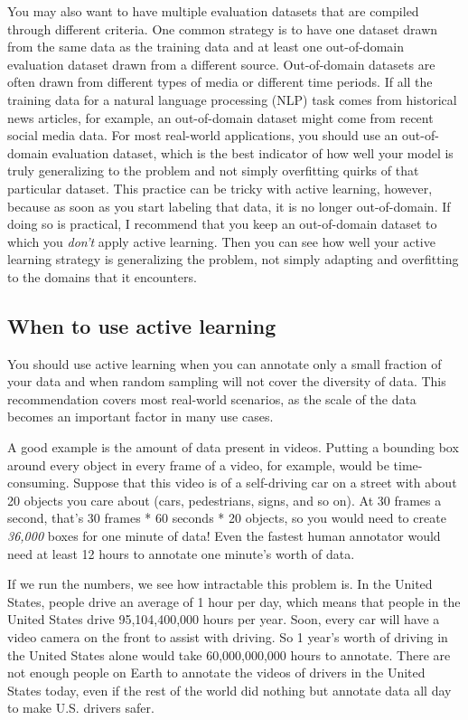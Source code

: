 \documentclass[sigconf,nonacm,screen,pbalance]{acmart}
\begin{document}
You
may also want to have multiple evaluation datasets that are compiled through different
criteria. One common strategy is to have one dataset drawn from the same data as the
training data and at least one out-of-domain evaluation dataset drawn from a different
source. Out-of-domain datasets are often drawn from different types of media or
different time periods. If all the training data for a natural language processing (NLP)
task comes from historical news articles, for example, an out-of-domain dataset might come
from recent social media data. For most real-world applications, you should use an
out-of-domain evaluation dataset, which is the best indicator of how well your model is
truly generalizing to the problem and not simply overfitting quirks of that particular
dataset. This practice can be tricky with active learning, however, because as soon as
you start labeling that data, it is no longer out-of-domain. If doing so is practical, I
recommend that you keep an out-of-domain dataset to which you {\em don't} apply active
learning. Then you can see how well your active learning strategy is generalizing the
problem, not simply adapting and overfitting to the domains that it encounters.

\subsection{When to use active learning}
You should
use active learning when you can annotate only a small fraction of your data and when
random sampling will not cover the diversity of data. This recommendation covers most
real-world scenarios, as the scale of the data becomes an important factor in many use
cases.

A
good example is the amount of data present in videos. Putting a bounding box around
every object in every frame of a video, for example, would be time-consuming. Suppose
that this video is of a self-driving car on a street with about 20 objects you care
about (cars, pedestrians, signs, and so on). At 30 frames a second, that's 30 frames *
60 seconds * 20 objects, so you would need to create {\em 36,000} boxes for one minute
of data! Even the fastest human annotator would need at least 12 hours to annotate one
minute's worth of data.

If
we run the numbers, we see how intractable this problem is. In the United States, people
drive an average of 1 hour per day, which means that people in the United States drive
95,104,400,000 hours per year. Soon, every car will have a video camera on the front to
assist with driving. So 1 year's worth of driving in the United States alone would take
60,000,000,000 hours to annotate. There are not enough people on Earth to
annotate the videos of drivers in the United States today, even if the rest of the world
did nothing but annotate data all day to make U.S. drivers safer.
\end{document}
